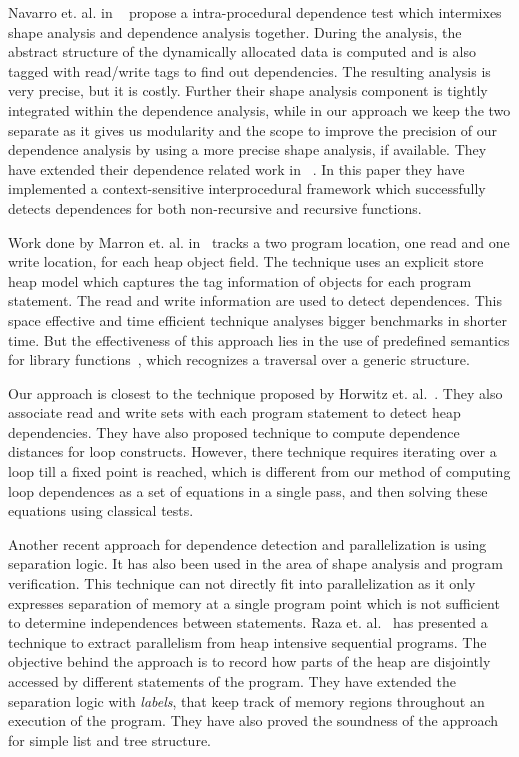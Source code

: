 Navarro et. al. in ~\cite{navarro04dependence, Navarro05loop} propose a 
intra-procedural dependence test which
intermixes shape analysis and dependence analysis
together. During the analysis, the abstract structure of the
dynamically allocated data is computed and is also tagged
with read/write tags to find out dependencies. The resulting
analysis is very precise, but it is costly. Further their
shape analysis component is tightly integrated within the
dependence analysis, while in our approach we keep the
  two separate as it gives us modularity and the scope to
  improve the precision of our dependence analysis by using a
  more precise shape analysis, if available. They have extended 
  their dependence related work in ~\cite{Navarro08irregular}. In this paper they 
  have implemented a context-sensitive interprocedural framework which successfully 
  detects dependences for both non-recursive and recursive functions. 

Work done by Marron et. al. in~\cite{Kapur08} tracks a two program location, 
one read and one write location, for each heap object field.  The technique 
uses an explicit store heap model which captures the tag information of 
objects for each program statement. The read and write information are used 
to detect dependences. This space effective and time efficient 
technique analyses bigger benchmarks in shorter time. But the effectiveness 
of this approach lies in the use of predefined semantics for library 
functions~\cite{Kapur06shape}, which recognizes a traversal over a generic structure. 


Our approach
is closest to the technique proposed by Horwitz
et. al.~\cite{horwitz89dependence}. They also associate read
and write sets with each program statement to detect heap
dependencies. They have also proposed technique to compute
dependence distances for loop constructs. However, there
technique requires iterating over a loop till a fixed point
is reached, which is different from our method of computing
loop dependences as a set of equations in a single pass, and
then solving these equations using classical tests.

Another recent approach for dependence detection and parallelization 
is using separation logic. 
It has also been used in the area of shape analysis and program verification. This technique can not directly fit into parallelization as it 
only expresses separation of memory at a single program point which is not 
sufficient to determine independences between statements. Raza et. al.~\cite{Raza09} has presented 
a technique to extract parallelism from heap intensive sequential programs. The 
objective behind the approach is to record how parts of the heap are disjointly accessed by different statements of the program. They have extended the separation logic with \emph{labels}, that keep track of memory regions throughout an execution of the program. They have also proved the soundness of the approach for simple list and tree structure. 